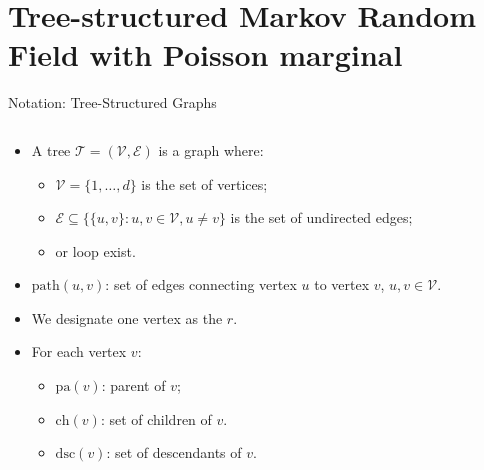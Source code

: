 \documentclass[11pt,xcolor={dvipsnames},hyperref={pdftex,pdfpagemode=UseNone,hidelinks,pdfdisplaydoctitle=true},usepdftitle=false]{beamer}
\begin{document}
\section{Tree-structured Markov Random Field with Poisson marginal}
\begin{frame}{Notation: Tree-Structured Graphs}
\begin{columns}
    \begin{column}{0.6\textwidth}
        \begin{itemize}
            \item A tree $\mathcal{T}=(\mathcal{V},\mathcal{E})$ is a graph where:
            \begin{itemize}
                \item $\mathcal{V}=\{1,\ldots,d\}$ is the set of vertices;
            \item $\mathcal{E} \subseteq \{\{u,v\} : u,v \in \mathcal{V}, u \neq v\}$ is the set of undirected edges;
            \item {} or loop exist.
            \end{itemize}
            \pause
            \item $\mathrm{path}(u, v)$: set of edges connecting vertex $u$ to vertex $v$, $u,v \in \mathcal{V}$.
            \pause
            \item We designate one vertex as the  $r$.
            \item For each vertex $v$:
            \begin{itemize}
                \item $\mathrm{pa}(v)$: parent of $v$;
                \item $\mathrm{ch}(v)$: set of children of $v$.
                \item $\mathrm{dsc}(v)$: set of descendants of $v$.
            \end{itemize}
        \end{itemize}
    \end{column}
    \begin{column}{0.4\textwidth}
    \end{column}
\end{columns}
\end{frame}
\end{document}
